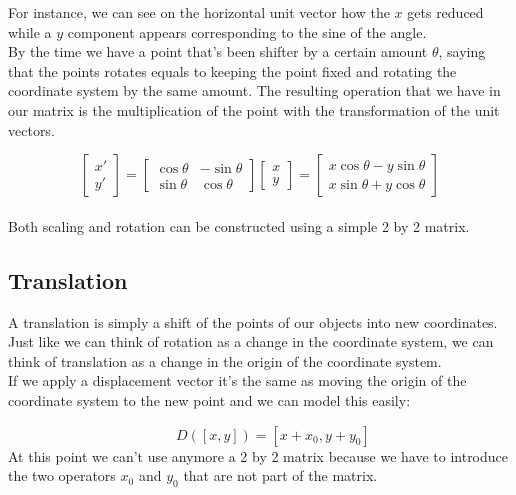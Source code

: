 For instance, we can see on the horizontal unit vector how the \(x\) gets reduced while a \(y\) component appears corresponding to the sine of the angle.
\\
By the time we have a point that's been shifter by a certain amount \(\theta\), saying that the points rotates equals to keeping the point fixed and rotating the coordinate system by the same amount. The resulting operation that we have in our matrix is the multiplication of the point with the transformation of the unit vectors.

\[
    \begin{bmatrix}
        x' \\
        y'
        \end{bmatrix}
        =
        \begin{bmatrix}
        \cos\theta & -\sin\theta \\
        \sin\theta & \cos\theta
        \end{bmatrix}
        \begin{bmatrix}
        x \\
        y
        \end{bmatrix}
        =
        \begin{bmatrix}
        x \cos\theta - y \sin\theta \\
        x \sin\theta + y \cos\theta
        \end{bmatrix}    
\]
\\
Both scaling and rotation can be constructed using a simple 2 by 2 matrix.
\subsection{Translation}

A translation is simply a shift of the points of our objects into new coordinates.
Just like we can think of rotation as a change in the coordinate system, we can think of translation as a change in the origin of the coordinate system.
\\
If we apply a displacement vector it's the same as moving the origin of the coordinate system to the new point and we can model this easily:

\(\quad \quad \quad \quad \quad \quad \quad \quad \quad \quad \quad \quad D([x, y]) = [x + x_0, y + y_0] \)
\\
At this point we can't use anymore a 2 by 2 matrix because we have to introduce the two operators \( x_0 \) and \( y_0 \) that are not part of the matrix. 

